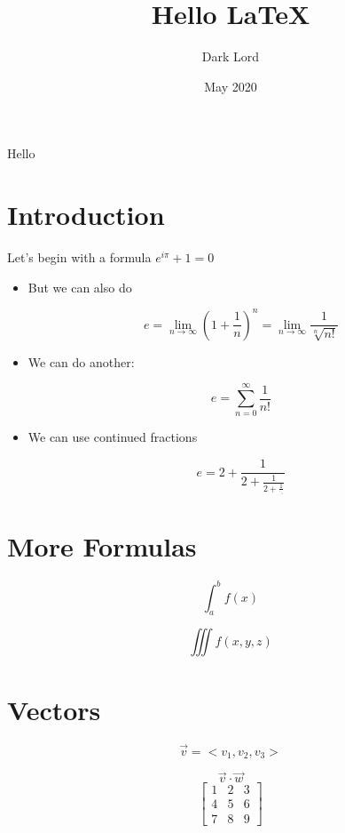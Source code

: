\documentclass{article}
\title{Hello \LaTeX}
\author{Dark Lord}
\date{May 2020}
\begin{document}
\maketitle

Hello
\section*{Introduction}
Let's begin with a formula $e^{i\pi}+1=0$


\begin{itemize}
\item But we can also do


\[
e = \lim_{n\to\infty}{\left(1+\frac{1}{n}\right)}^n = 
\lim_{n\to\infty} \frac{1}{ \sqrt[n]{n!}}   
\]

\item We can do another:

\[ 
    e = \sum_{n=0}^{\infty} \frac{1}{n!}
\]

\item We can use continued fractions

\[
    e = 2+\frac{1}{2+\frac{1}{2 + \frac{1}{\ddots}  }}
\]

\end{itemize}


\section*{More Formulas}

\[
    \int_{a}^{b} f(x)
\]

\[
    \iiint f(x,y,z)
\]

\section*{Vectors}
\[
    \vec{v} = <v_1,v_2,v_3>
\]

\[
    \vec{v} \cdot \vec{w}
\]
\[
    \begin{bmatrix}
        1 & 2 & 3 \\
        4 & 5 & 6 \\
        7 & 8 & 9 
    \end{bmatrix}
\]
\end{document}
